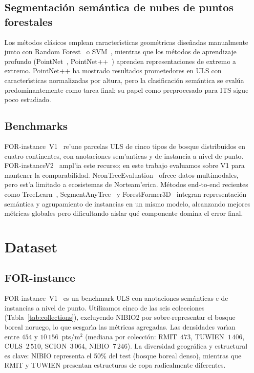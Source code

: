 \documentclass[runningheads]{llncs}
\begin{document}
\subsection{Segmentación semántica de nubes de puntos forestales}

Los m\'etodos cl\'asicos emplean caracter\'\i{}sticas geom\'etricas dise\~nadas manualmente junto con Random Forest~\cite{breiman2001} o SVM~\cite{weinmann2015,weinmann2017}, mientras que los m\'etodos de aprendizaje profundo (PointNet~\cite{qi2016}, PointNet++~\cite{qi2017}) aprenden representaciones de extremo a extremo. PointNet++ ha mostrado resultados prometedores en ULS con caracter\'\i{}sticas normalizadas por altura, pero la clasificaci\'on sem\'antica se eval\'ua predominantemente como tarea final; su papel como preprocesado para ITS sigue poco estudiado.

\subsection{Benchmarks}

FOR-instance~V1~\cite{puliti2023} re'une parcelas ULS de cinco tipos de bosque distribuidos en cuatro continentes, con anotaciones sem'anticas y de instancia a nivel de punto. FOR-instanceV2~\cite{xiang2025} ampl'ia este recurso; en este trabajo evaluamos sobre V1 para mantener la comparabilidad. NeonTreeEvaluation~\cite{weinstein2021} ofrece datos multimodales, pero est'a limitado a ecosistemas de Norteam'erica.
Métodos end-to-end recientes como TreeLearn~\cite{henrich2024}, SegmentAnyTree~\cite{wielgosz2024} y ForestFormer3D~\cite{xiang2025} integran representación semántica y agrupamiento de instancias en un mismo modelo, alcanzando mejores métricas globales pero dificultando aislar qué componente domina el error final.

\section{Dataset}\label{sec:dataset}

\subsection{FOR-instance}

FOR-instance~V1~\cite{puliti2023} es un benchmark ULS con anotaciones sem\'anticas e de instancias a nivel de punto. Utilizamos cinco de las seis colecciones (Tabla~\ref{tab:collections}), excluyendo NIBIO2 por sobre-representar el bosque boreal noruego, lo que sesgar\'\i{}a las m\'etricas agregadas. Las densidades var\'\i{}an entre $454$ y $10\,156$~pts/m$^2$ (mediana por colecci\'on: RMIT~$473$, TUWIEN~$1\,406$, CULS~$2\,510$, SCION~$3\,064$, NIBIO~$7\,246$). La diversidad geogr\'afica y estructural es clave: NIBIO representa el 50\% del test (bosque boreal denso), mientras que RMIT y TUWIEN presentan estructuras de copa radicalmente diferentes.
\end{document}
